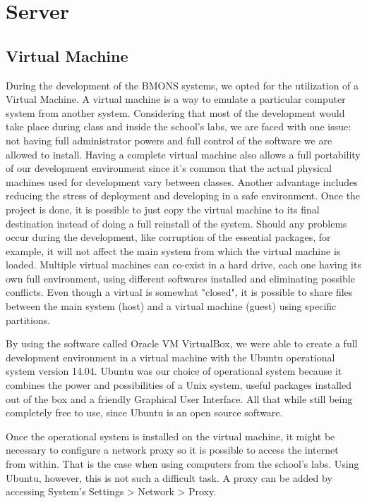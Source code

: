 \chapter{Server}
\section{Virtual Machine}

During the development of the BMONS systems, we opted for the utilization of a Virtual Machine. A virtual machine is a way to emulate a particular computer system from another system. Considering that most of the development would take place during class and inside the school's labs, we are faced with one issue: not having full administrator powers and full control of the software we are allowed to install. Having a complete virtual machine also allows a full portability of our development environment since it's common that the actual physical machines used for development vary between classes. Another advantage includes reducing the stress of deployment and developing in a safe environment. Once the project is done, it is possible to just copy the virtual machine to its final destination instead of doing a full reinstall of the system. Should any problems occur during the development, like corruption of the essential packages, for example, it will not affect the main system from which the virtual machine is loaded. Multiple virtual machines can co-exist in a hard drive, each one having its own full environment, using different softwares installed and eliminating possible conflicts. Even though a virtual is somewhat "closed", it is possible to share files between the main system (host) and a virtual machine (guest) using specific partitions. 


By using the software called Oracle VM VirtualBox, we were able to create a full development environment in a virtual machine with the Ubuntu operational system version 14.04. Ubuntu was our choice of operational system because it combines the power and possibilities of a Unix system, useful packages installed out of the box and a friendly Graphical User Interface. All that while still being completely free to use, since Ubuntu is an open source software. 


Once the operational system is installed on the virtual machine, it might be necessary to configure a network proxy so it is possible to access the internet from within. That is the case when using computers from the school's labs. Using Ubuntu, however, this is not such a difficult task. A proxy can be added by accessing System's Settings > Network > Proxy. 

